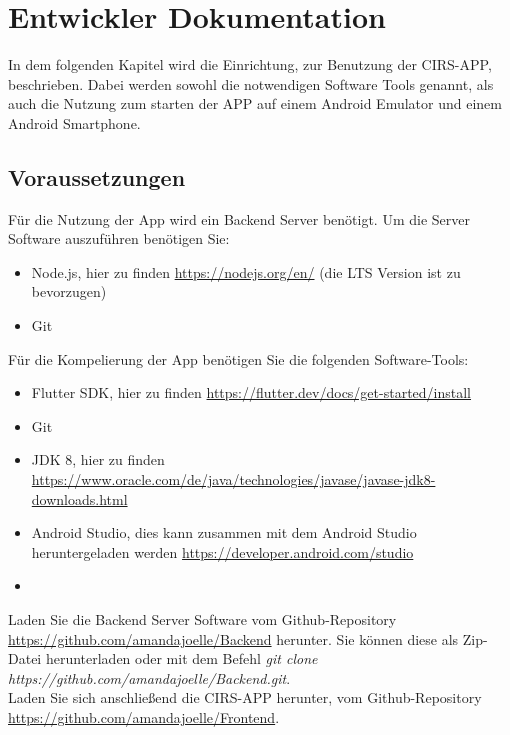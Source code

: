 \chapter{Entwickler Dokumentation}
\label{entw_docu}
In dem folgenden Kapitel wird die Einrichtung, zur Benutzung der CIRS-APP, beschrieben. Dabei werden sowohl die notwendigen Software Tools genannt, als auch die Nutzung zum starten der APP auf einem Android Emulator und einem Android Smartphone.

\section{Voraussetzungen}
\label{voraussertungen}
Für die Nutzung der App wird ein Backend Server benötigt. Um die Server Software auszuführen benötigen Sie:
\begin{itemize}
\item Node.js, hier zu finden \url{https://nodejs.org/en/} (die LTS Version ist zu bevorzugen)
\item Git
\end{itemize}
Für die Kompelierung der App benötigen Sie die folgenden Software-Tools:
\begin{itemize}
\item Flutter SDK, hier zu finden \url{https://flutter.dev/docs/get-started/install}
\item Git
\item JDK 8, hier zu finden \url{https://www.oracle.com/de/java/technologies/javase/javase-jdk8-downloads.html}
\item Android Studio, dies kann zusammen mit dem Android Studio heruntergeladen werden \url{https://developer.android.com/studio}
\item 
\end{itemize}
Laden Sie die Backend Server Software vom Github-Repository \url{https://github.com/amandajoelle/Backend} herunter. Sie können diese als Zip-Datei herunterladen oder mit dem Befehl \textit{git clone https://github.com/amandajoelle/Backend.git}.\\
Laden Sie sich anschließend die CIRS-APP herunter, vom Github-Repository \url{https://github.com/amandajoelle/Frontend}.

